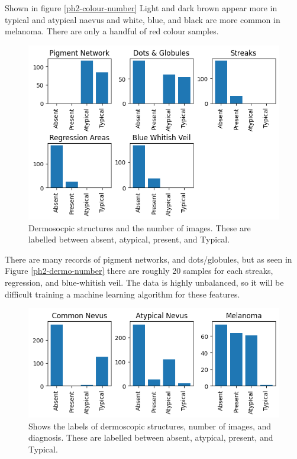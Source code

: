 Shown in figure \ref{ph2-colour-number} Light and dark brown appear more in typical and atypical naevus and white, blue, and black are more common in melanoma. There are only a handful of red colour samples.

\begin{figure}
	\centering
	\includegraphics[scale=0.8]{images/ph2/ph2-dermo-number.png}
	\caption{Dermosocpic structures and the number of images. These are labelled between absent, atypical, present, and Typical.} 
\end{figure} \label{ph2-dermo-number}

There are many records of pigment networks, and dots/globules, but as seen in Figure \ref{ph2-dermo-number} there are roughly 20 samples for each streaks, regression, and blue-whitish veil. The data is highly unbalanced, so it will be difficult training a machine learning algorithm for these features.

\begin{figure}
	\centering
	\includegraphics[scale=0.8]{images/ph2/ph2-dermo-diagnosis.png}
	\caption{Shows the labels of dermoscopic structures, number of images, and diagnosis. These are labelled between absent, atypical, present, and Typical.} 
\end{figure} \label{ph2-dermo-diagnosis}

